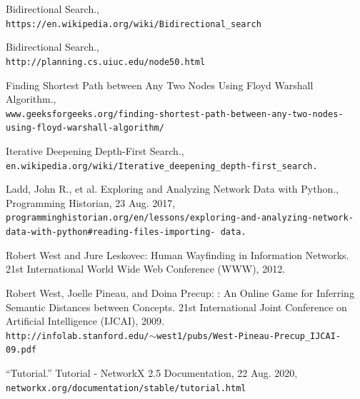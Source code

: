 \documentclass[letterpaper]{article} %
\begin{document}
\begin{thebibliography}{10}

 Bidirectional Search.,
\\\texttt{https://en.wikipedia.org/wiki/\allowbreak Bidirectional\_search}

 Bidirectional Search.,
\\\texttt{http://planning.cs.uiuc.edu/node50.html}

 Finding Shortest Path between Any Two Nodes Using Floyd Warshall Algorithm.,
\\\texttt{www.geeksforgeeks.org/finding-shortest-\allowbreak path-between-any-two-nodes-using-floyd\allowbreak-warshall-algorithm/}

 Iterative Deepening Depth-First Search.,
\\\texttt{en.wikipedia.org/wiki/Iterative\_deepening\allowbreak\_depth-first\_search.}

 Ladd, John R., et al. Exploring and Analyzing Network Data with Python., Programming Historian, 23 Aug. 2017,
\\\texttt{programminghistorian.org/en/lessons/\allowbreak exploring-and-analyzing-network-data-\allowbreak with-python\#reading-files-importing- \allowbreak data.}

 Robert West and Jure Leskovec:
     Human Wayfinding in Information Networks.
     21st International World Wide Web Conference (WWW), 2012.
     
\bibitem{} Robert West, Joelle Pineau, and Doina Precup:
     : An Online Game for Inferring Semantic Distances between Concepts.
     21st International Joint Conference on Artificial Intelligence (IJCAI), 2009.
\\\texttt{http://infolab.stanford.edu/$\sim$west1/pubs/\allowbreak West-Pineau-Precup\_IJCAI-09.pdf}

“Tutorial.” Tutorial - NetworkX 2.5 Documentation, 22 Aug. 2020, \\\texttt{networkx.org/documentation/stable/\allowbreak tutorial.html}

\end{thebibliography}
\end{document}
